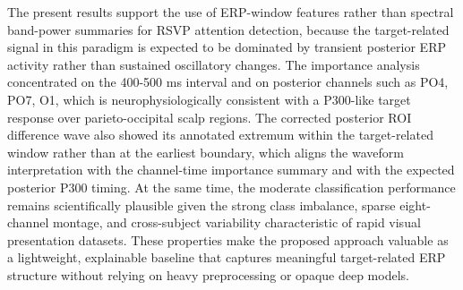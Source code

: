 The present results support the use of ERP-window features rather than spectral band-power summaries for RSVP attention detection, because the target-related signal in this paradigm is expected to be dominated by transient posterior ERP activity rather than sustained oscillatory changes. The importance analysis concentrated on the 400-500 ms interval and on posterior channels such as PO4, PO7, O1, which is neurophysiologically consistent with a P300-like target response over parieto-occipital scalp regions. The corrected posterior ROI difference wave also showed its annotated extremum within the target-related window rather than at the earliest boundary, which aligns the waveform interpretation with the channel-time importance summary and with the expected posterior P300 timing. At the same time, the moderate classification performance remains scientifically plausible given the strong class imbalance, sparse eight-channel montage, and cross-subject variability characteristic of rapid visual presentation datasets. These properties make the proposed approach valuable as a lightweight, explainable baseline that captures meaningful target-related ERP structure without relying on heavy preprocessing or opaque deep models.
